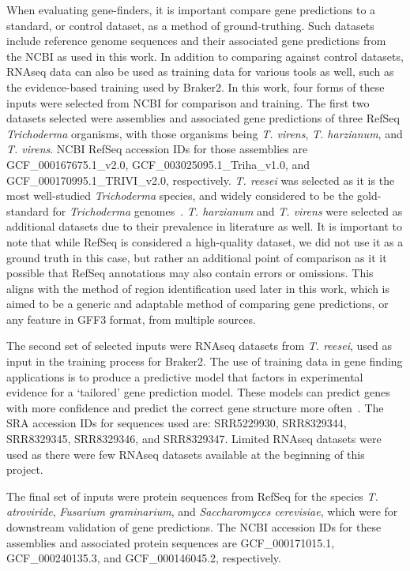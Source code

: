 When evaluating gene-finders, it is important compare gene predictions
to a standard, or control dataset, as a method of
ground-truthing. Such datasets include reference genome sequences and
their associated gene predictions from the NCBI as used in this work. In
addition to comparing against control datasets, RNAseq data can also
be used as training data for various tools as well, such as the
evidence-based training used by Braker2. In this work, four forms of
these inputs were selected from NCBI for comparison and training. The
first two datasets selected were assemblies and associated gene
predictions of three RefSeq \textit{Trichoderma} organisms, with
those organisms being \textit{T. virens}, \textit{T. harzianum}, and
\textit{T. virens}. NCBI RefSeq accession IDs for those assemblies are
GCF\_000167675.1\_v2.0, GCF\_003025095.1\_Triha\_v1.0, and
GCF\_000170995.1\_TRIVI\_v2.0, respectively. \textit{T. reesei} was
selected as it is the most well-studied \textit{Trichoderma} species,
and widely considered to be the gold-standard for \textit{Trichoderma}
genomes~\cite{gupta2016}. \textit{T. harzianum} and \textit{T. virens} were selected as additional datasets due to their prevalence in literature as well. It is important to note that while RefSeq is considered a high-quality
dataset, we did not use it as a ground truth in this case, but rather an additional point of comparison as it it possible that RefSeq annotations may also contain errors or omissions. This aligns with the method of region identification used later in this work, which is aimed to be a generic and adaptable method of comparing gene predictions, or any feature in GFF3 format, from multiple sources.

The second set of selected inputs were RNAseq datasets from 
\textit{T. reesei}, used as input in the training process for
Braker2. The use of training data in gene finding applications is to
produce a predictive model that factors in experimental evidence for a
`tailored' gene prediction model. These models can predict genes with
more confidence and predict the correct gene structure more
often~\cite{liang2009}. The SRA accession IDs for sequences used are:
SRR5229930, SRR8329344, SRR8329345, SRR8329346, and
SRR8329347. Limited RNAseq datasets were used as there were few RNAseq
datasets available at the beginning of this project.

The final set of inputs were protein sequences from RefSeq for the species
\textit{T. atroviride}, \textit{Fusarium graminarium}, and
\textit{Saccharomyces cerevisiae}, which were for downstream
validation of gene predictions.  The NCBI accession IDs for these
assemblies and associated protein sequences are GCF\_000171015.1,
GCF\_000240135.3, and GCF\_000146045.2, respectively.

